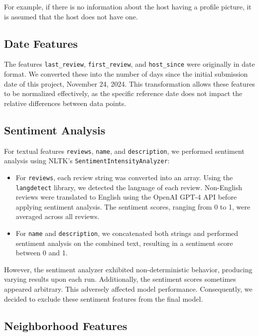 \documentclass[12pt]{article}
\begin{document}
For example, if there is no information about the host having a profile picture, it is assumed that the host does not have one.

\subsection{Date Features}

The features \texttt{last\_review}, \texttt{first\_review}, and \texttt{host\_since} were originally in date format. We converted these into the number of days since the initial submission date of this project, November 24, 2024. This transformation allows these features to be normalized effectively, as the specific reference date does not impact the relative differences between data points.

\subsection{Sentiment Analysis}

For textual features \texttt{reviews}, \texttt{name}, and \texttt{description}, we performed sentiment analysis using NLTK's \texttt{SentimentIntensityAnalyzer}:

\begin{itemize}
    \item For \texttt{reviews}, each review string was converted into an array. Using the \texttt{langdetect} library, we detected the language of each review. Non-English reviews were translated to English using the OpenAI GPT-4 API before applying sentiment analysis. The sentiment scores, ranging from 0 to 1, were averaged across all reviews.
    
    \item For \texttt{name} and \texttt{description}, we concatenated both strings and performed sentiment analysis on the combined text, resulting in a sentiment score between 0 and 1.
\end{itemize}

However, the sentiment analyzer exhibited non-deterministic behavior, producing varying results upon each run. Additionally, the sentiment scores sometimes appeared arbitrary. This adversely affected model performance. Consequently, we decided to exclude these sentiment features from the final model.

\subsection{Neighborhood Features}
\end{document}
